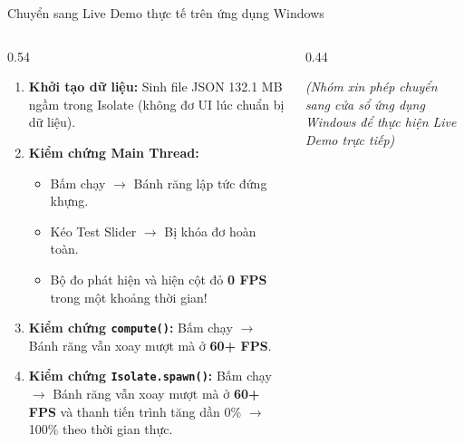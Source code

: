 \documentclass[aspectratio=169, 10pt]{beamer}
\begin{document}
\begin{frame}{Chuyển sang Live Demo thực tế trên ứng dụng Windows}
  \begin{columns}[c]
    \begin{column}{0.54\textwidth}
      \begin{enumerate}
        \item \textbf{Khởi tạo dữ liệu:} Sinh file JSON 132.1 MB ngầm trong Isolate (không đơ UI lúc chuẩn bị dữ liệu).
        \item \textbf{Kiểm chứng Main Thread:}
        \begin{itemize}
          \item Bấm chạy $\rightarrow$ Bánh răng lập tức đứng khựng.
          \item Kéo Test Slider $\rightarrow$ Bị khóa đơ hoàn toàn.
          \item Bộ đo phát hiện và hiện cột đỏ \textbf{0 FPS} trong một khoảng thời gian!
        \end{itemize}
        \item \textbf{Kiểm chứng \texttt{compute()}:} Bấm chạy $\rightarrow$ Bánh răng vẫn xoay mượt mà ở \textbf{60+ FPS}.
        \item \textbf{Kiểm chứng \texttt{Isolate.spawn()}:} Bấm chạy $\rightarrow$ Bánh răng vẫn xoay mượt mà ở \textbf{60+ FPS} và thanh tiến trình tăng dần 0\% $\rightarrow$ 100\% theo thời gian thực.
      \end{enumerate}
    \end{column}

    \begin{column}{0.44\textwidth}
      \centering
      \par\vspace{0.3cm}
      {\scriptsize \textit{(Nhóm xin phép chuyển sang cửa sổ ứng dụng Windows để thực hiện Live Demo trực tiếp)}\par}
    \end{column}
  \end{columns}
\end{frame}
\end{document}
